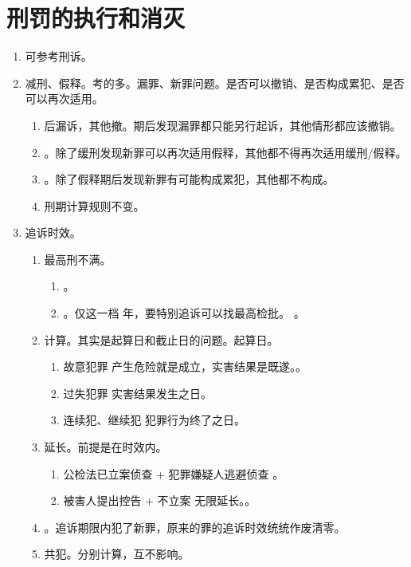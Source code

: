 \section{刑罚的执行和消灭}
\begin{enumerate}
  \item 可参考刑诉。
  \item 减刑、假释。考的多。漏罪、新罪问题。是否可以撤销、是否构成累犯、是否可以再次适用。
        \begin{enumerate}
          \item 后漏诉，其他撤。期后发现漏罪都只能另行起诉，其他情形都应该撤销。
          \item {}。除了缓刑发现新罪可以再次适用假释，其他都不得再次适用缓刑/假释。
          \item {}。除了假释期后发现新罪有可能构成累犯，其他都不构成。
          \item 刑期计算规则不变。
        \end{enumerate}
  \item 追诉时效。
        \begin{enumerate}
          \item 最高刑不满。
                \begin{enumerate}
                  \item {}。
                  \item {}。仅这一档  年，要特别追诉可以找最高检批。
                        。
                \end{enumerate}
          \item 计算。其实是起算日和截止日的问题。起算日。
                \begin{enumerate}
                  \item 故意犯罪 \yjt 产生危险就是成立，实害结果是既遂。。
                  \item 过失犯罪 \yjt 实害结果发生之日。
                  \item 连续犯、继续犯 \yjt 犯罪行为终了之日。
                \end{enumerate}
          \item 延长。前提是在时效内。
                \begin{enumerate}
                  \item 公检法已立案侦查 + 犯罪嫌疑人逃避侦查 \yjt {}。
                  \item 被害人提出控告 + 不立案 \yjt 无限延长。。
                \end{enumerate}
          \item {}。追诉期限内犯了新罪，原来的罪的追诉时效统统作废清零。
          \item 共犯。分别计算，互不影响。
        \end{enumerate}
\end{enumerate}

